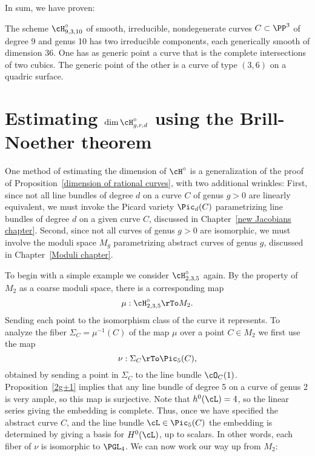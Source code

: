 In sum, we have proven:
\begin{proposition}
 The scheme $\cH^\circ_{9,3,10}$ of smooth, irreducible, nondegenerate curves $C \subset \PP^3$ of degree 9 and genus 10 has two irreducible components, each generically smooth of dimension 36. One has as generic point a curve that is the complete intersections of two cubics. The generic point of the other is a curve of type $(3,6)$ on a quadric surface. \end{proposition}







\section{Estimating $\dim \cH^\circ_{g,r,d}$ using the Brill-Noether theorem}\label{estimating dim hilb}

One method of estimating  the dimension of $\cH^\circ$ is a generalization of the proof of Proposition~\ref{dimension of rational curves}, with two additional wrinkles: First, since not all line bundles of degree $d$ on a curve $C$ of genus $g > 0$ are linearly equivalent, we must invoke the Picard variety $\Pic_d(C)$ parametrizing line bundles of degree $d$ on a given curve $C$, discussed in Chapter~\ref{new Jacobians chapter}. Second, since not all curves of genus $g > 0$ are isomorphic, we must involve the moduli space  $M_g$ parametrizing abstract curves of genus $g$, discussed in Chapter~\ref{Moduli chapter}.

To begin with a simple example we consider $\cH^\circ_{2,3,5}$ again. By the property of $M_{2}$ as a coarse moduli space, there is a corresponding map
$$
\mu : \cH^\circ_{2,3,5} \rTo M_2.
$$
Sending each point to the isomorphism class of the curve it represents.
To analyze the fiber $\Sigma_C =\mu^{-1}(C)$ of the map $\mu$ over a point $C \in M_2$ we first use the map
$$
\nu : \Sigma_C \rTo \Pic_5(C),
$$
obtained by sending a point in $\Sigma_C$ to the line bundle $\cO_C(1)$. Proposition~\ref{2g+1} implies that any line bundle of degree 5 on a curve of genus 2 is very ample, so this map is surjective. Note that 
$h^0(\cL) = 4$, so the linear series  giving the embedding is complete. Thus, once we have specified the abstract curve $C$, and the line bundle $\cL \in \Pic_5(C)$ the embedding is determined by giving a basis for $H^0(\cL)$, up to scalars. In other words, each fiber of $\nu$ is isomorphic to $\PGL_4$. We can now work our way up from $M_2$:

